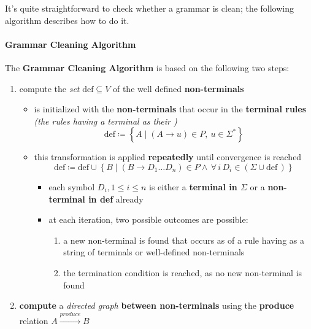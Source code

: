 \documentclass[english]{article}
\begin{document}
It's quite straightforward to check whether a grammar is clean;
the following algorithm describes how to do it.

\paragraph{Grammar Cleaning Algorithm}

The \textbf{Grammar Cleaning Algorithm} is based on the following two steps:

\begin{enumerate}[label=step \arabic*., ref=(step \arabic*), labelindent=2em, leftmargin=*, widest=7]
  \item compute the \textit{set} \(\text{def} \subseteq V\) of the well defined \textbf{non-terminals}
        \begin{itemize}
          \item {} is initialized with the \textbf{non-terminals} that occur in the \textbf{terminal rules} \textit{(the rules having a terminal as their \RP)}
                \[ \text{def} \coloneqq \left\{ A \mid (A \rightarrow u) \in P, \ u \in \Sigma^\ast  \right\} \]
          \item this transformation is applied \textbf{repeatedly} until convergence is reached
                \[ \text{def} \coloneqq \text{def} \cup \left\{ B \mid (B \rightarrow D_1 \ldots D_n) \in P \land \, \forall \, i \, D_i \in \left(\Sigma \cup \text{def} \,\right)\right\} \]
                \begin{itemize}
                  \item each symbol \(D_i, 1 \leq i \leq n\) is either a \textbf{terminal in \(\Sigma\)} or a \textbf{non-terminal in def} already
                  \item at each iteration, two possible outcomes are possible:
                        \begin{enumerate}
                          \item a new non-terminal is found that occurs as \LP of a rule having as \RP a string of terminals or well-defined non-terminals
                          \item the termination condition is reached, as no new non-terminal is found
                        \end{enumerate}
                \end{itemize}
        \end{itemize}
  \item \textbf{compute} a \textit{directed graph} \textbf{between non-terminals} using the \textbf{produce} relation \(A \xrightarrow{produce} B\)

\end{enumerate}
\end{document}

